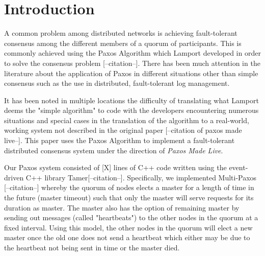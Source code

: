 
\section{Introduction}
A common problem among distributed networks is achieving fault-tolerant consensus among the different members of a quorum of participants.  This is commonly achieved using the Paxos Algorithm which Lamport developed in order to solve the consensus problem [--citation--].  There has been much attention in the literature about the application of Paxos in different situations other than simple consensus such as the use in distributed, fault-tolerant log management.  

It has been noted in multiple locations the difficulty of translating what Lamport deems the "simple algorithm" to code with the developers encountering numerous situations and special cases in the translation of the algorithm to a real-world, working system not described in the original paper [--citation of paxos made live--].  This paper uses the Paxos Algorithm to implement a fault-tolerant distributed consensus system under the direction of \textit{Paxos Made Live}. 

Our Paxos system consisted of [X] lines of C++ code written using the event-driven C++ library Tamer[--citation--].  Specifically, we implemented Multi-Paxos [--citation--] whereby the quorum of nodes elects a master for a length of time in the future (master timeout) such that only the master will serve requests for its duration as master.  The master also has the option of remaining master by sending out messages (called "heartbeats") to the other nodes in the quorum at a fixed interval.  Using this model, the other nodes in the quorum will elect a new master once the old one does not send a heartbeat which either may be due to the heartbeat not being sent in time or the master died.
